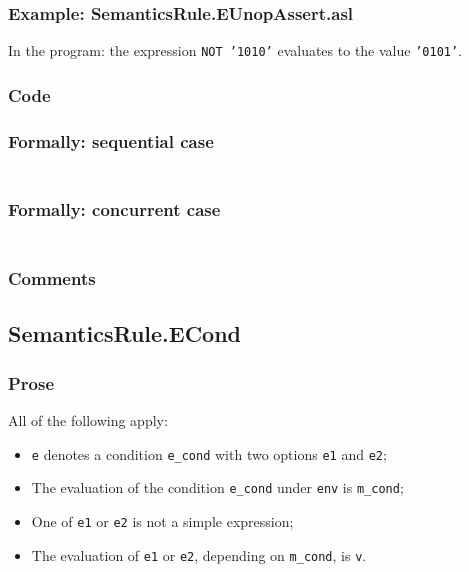 \documentclass{book}
\begin{document}
  \subsubsection{Example: SemanticsRule.EUnopAssert.asl}
    In the program:
    the expression \texttt{NOT '1010'} evaluates to the value \texttt{'0101'}.

  \subsubsection{Code}

  \subsubsection{Formally: sequential case}
  \begin{align}
  \end{align} 

  \subsubsection{Formally: concurrent case}
  \begin{align}
  \end{align} 

  \subsubsection{Comments}

\subsection{SemanticsRule.ECond \label{sec:SemanticsRule.ECond}}

  \subsubsection{Prose}
  All of the following apply:
  \begin{itemize}
  \item \texttt{e} denotes a condition \texttt{e\_cond} with two options \texttt{e1} and \texttt{e2};
  \item The evaluation of the condition \texttt{e\_cond} under \texttt{env} is \texttt{m\_cond};
  \item One of \texttt{e1} or \texttt{e2} is not a simple expression;
  \item The evaluation of \texttt{e1} or \texttt{e2}, depending on \texttt{m\_cond}, is \texttt{v}.
  \end{itemize}
\end{document}
